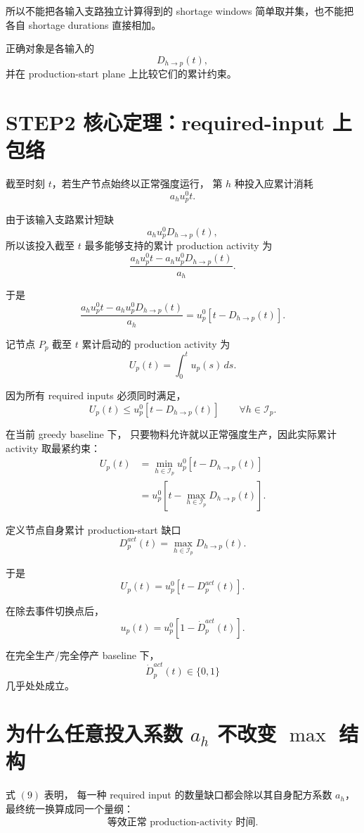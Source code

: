\documentclass[UTF8,11pt]{ctexart}
\begin{document}
所以不能把各输入支路独立计算得到的 shortage windows
简单取并集，也不能把各自 shortage durations 直接相加。

正确对象是各输入的
\[
D_{h\to p}(t),
\]
并在 production-start plane 上比较它们的累计约束。

\section{STEP2 核心定理：required-input 上包络}

截至时刻 \(t\)，若生产节点始终以正常强度运行，
第 \(h\) 种投入应累计消耗
\[
a_hu_p^0t.
\]

由于该输入支路累计短缺
\[
a_hu_p^0D_{h\to p}(t),
\]
所以该投入截至 \(t\) 最多能够支持的累计 production activity 为
\[
\frac{
a_hu_p^0t
-
a_hu_p^0D_{h\to p}(t)
}{a_h}.
\]

于是
\[
\boxed{
\frac{
a_hu_p^0t
-
a_hu_p^0D_{h\to p}(t)
}{a_h}
=
u_p^0
\left[
t-D_{h\to p}(t)
\right].
}
\tag{9}
\]

记节点 \(P_p\) 截至 \(t\) 累计启动的 production activity 为
\[
\boxed{
U_p(t)=\int_0^t u_p(s)\,ds.
}
\tag{10}
\]

因为所有 required inputs 必须同时满足，
\[
U_p(t)
\le
u_p^0
\left[
t-D_{h\to p}(t)
\right]
\qquad
\forall h\in\mathcal I_p.
\]

在当前 greedy baseline 下，
只要物料允许就以正常强度生产，因此实际累计 activity 取最紧约束：
\[
\begin{aligned}
U_p(t)
&=
\min_{h\in\mathcal I_p}
u_p^0
\left[
t-D_{h\to p}(t)
\right]
\\
&=
u_p^0
\left[
t-
\max_{h\in\mathcal I_p}
D_{h\to p}(t)
\right].
\end{aligned}
\tag{11}
\]

定义节点自身累计 production-start 缺口
\[
\boxed{
D_p^{act}(t)
=
\max_{h\in\mathcal I_p}
D_{h\to p}(t).
}
\tag{12}
\]

于是
\[
\boxed{
U_p(t)
=
u_p^0
\left[
t-D_p^{act}(t)
\right].
}
\tag{13}
\]

在除去事件切换点后，
\[
\boxed{
u_p(t)
=
u_p^0
\left[
1-\dot D_p^{act}(t)
\right].
}
\tag{14}
\]

在完全生产/完全停产 baseline 下，
\[
\dot D_p^{act}(t)\in\{0,1\}
\]
几乎处处成立。

\section{为什么任意投入系数 \(a_h\) 不改变 \(\max\) 结构}

式 \((9)\) 表明，
每一种 required input 的数量缺口都会除以其自身配方系数 \(a_h\)，
最终统一换算成同一个量纲：
\[
\boxed{\text{等效正常 production-activity 时间}.}
\]
\end{document}

